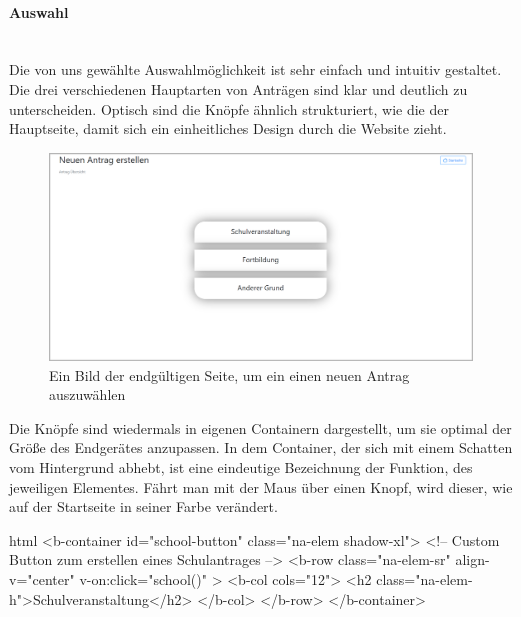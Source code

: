 \paragraph{Auswahl}
~\\
Die von uns gewählte Auswahlmöglichkeit ist sehr einfach und intuitiv gestaltet. Die drei verschiedenen Hauptarten von Anträgen sind klar und deutlich zu unterscheiden. Optisch sind die Knöpfe ähnlich strukturiert, wie die der Hauptseite, damit sich ein einheitliches Design durch die Website zieht.
\begin{figure}[H]
	\centering
	\includegraphics[width=1\linewidth]{images/website/neu}
	\caption[Neuer Antrag Auswahl]{Ein Bild der endgültigen Seite, um ein einen neuen Antrag auszuwählen}
	\label{fig:neuauswahl}
\end{figure}
Die Knöpfe sind wiedermals in eigenen Containern dargestellt, um sie optimal der Größe des Endgerätes anzupassen. In dem Container, der sich mit einem Schatten vom Hintergrund abhebt, ist eine eindeutige Bezeichnung der Funktion, des jeweiligen Elementes. Fährt man mit der Maus über einen Knopf, wird dieser, wie auf der Startseite in seiner Farbe verändert.
\begin{code}{html}
	<b-container id="school-button" class="na-elem shadow-xl">
	<!-- Custom Button zum erstellen eines Schulantrages -->
	<b-row
	  class="na-elem-sr"
	  align-v="center"
	  v-on:click="school()"
	>
	  <b-col cols="12">
		<h2 class="na-elem-h">Schulveranstaltung</h2>
	  </b-col>
	</b-row>
  </b-container>	
\end{code}
	\label{list:htmlselect} ~\\
